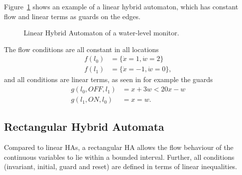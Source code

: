 \begin{ex}
Figure~\ref{fig:linHAex} shows an example of a linear hybrid automaton, which has constant flow and linear terms as guards on the edges.
\begin{figure}[H]
    \begin{center}
        \caption{Linear Hybrid Automaton of a water-level monitor.}
        \label{fig:linHAex}
    \end{center}
\end{figure}
The flow conditions are all constant in all locations
\begin{align*}
f(l_{0}) & =\{\dot{x}=1,\dot{w}=2\} \\
f(l_{1}) & =\{\dot{x}=-1,\dot{w}=0\},
\end{align*}
and all conditions are linear terms, as seen in for example the guards
\begin{align*}
g(l_{0},OFF,l_{1}) & = x+3w<20x-w \\
g(l_{1},ON,l_{0}) & = x=w .
\end{align*}
\end{ex}



\subsection{Rectangular Hybrid Automata}
Compared to linear HAs, a rectangular HA allows the flow behaviour of the continuous variables to lie within a bounded interval.  \cite{Henzinger1995, Puri1994} Further, all conditions (invariant, initial, guard and reset) are defined in terms of linear inequalities.


